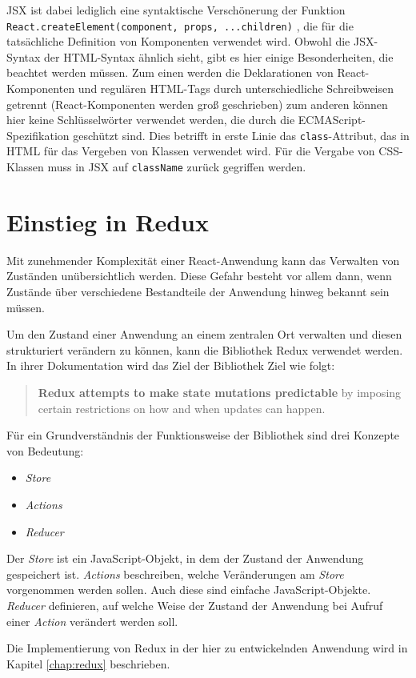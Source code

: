 JSX ist dabei lediglich eine syntaktische Verschönerung der Funktion \verb|React.createElement(component, props, ...children)| \cite{ReactJSX}, die für die tatsächliche Definition von Komponenten verwendet wird.
Obwohl die JSX-Syntax der HTML-Syntax ähnlich sieht, gibt es hier einige Besonderheiten, die beachtet werden müssen.
Zum einen werden die Deklarationen von React-Komponenten und regulären HTML-Tags durch unterschiedliche Schreibweisen getrennt (React-Komponenten werden groß geschrieben) zum anderen können hier keine Schlüsselwörter verwendet werden, die durch die ECMAScript-Spezifikation geschützt sind\footnotemark{}. Dies betrifft in erste Linie das \verb|class|-Attribut, das in HTML für das Vergeben von Klassen verwendet wird. Für die Vergabe von CSS-Klassen muss in JSX auf \verb|className| zurück gegriffen werden.


\section{Einstieg in Redux}
Mit zunehmender Komplexität einer React-Anwendung kann das Verwalten von Zuständen unübersichtlich werden. Diese Gefahr besteht vor allem dann, wenn Zustände über verschiedene Bestandteile der Anwendung hinweg bekannt sein müssen.

Um den Zustand einer Anwendung an einem zentralen Ort verwalten und diesen strukturiert verändern zu können, kann die Bibliothek Redux\footnotemark{} verwendet werden. In ihrer Dokumentation wird das Ziel der Bibliothek Ziel wie folgt:


\begin{quote}
  \textbf{Redux attempts to make state mutations predictable} by imposing certain restrictions on how and when updates can happen. \cite{ReduxMotivation}
\end{quote}

Für ein Grundverständnis der Funktionsweise der Bibliothek sind drei Konzepte von Bedeutung:

\begin{itemize}
  \item \textit{Store}
  \item \textit{Actions}
  \item \textit{Reducer}
\end{itemize}

Der \textit{Store} ist ein JavaScript-Objekt, in dem der Zustand der Anwendung gespeichert ist. \textit{Actions} beschreiben, welche Veränderungen am \textit{Store} vorgenommen werden sollen. Auch diese sind einfache JavaScript-Objekte. \textit{Reducer} definieren, auf welche Weise der Zustand der Anwendung bei Aufruf einer \textit{Action} verändert werden soll. \cite{ReduxCore}

Die Implementierung von Redux in der hier zu entwickelnden Anwendung wird in Kapitel \ref{chap:redux} beschrieben.
